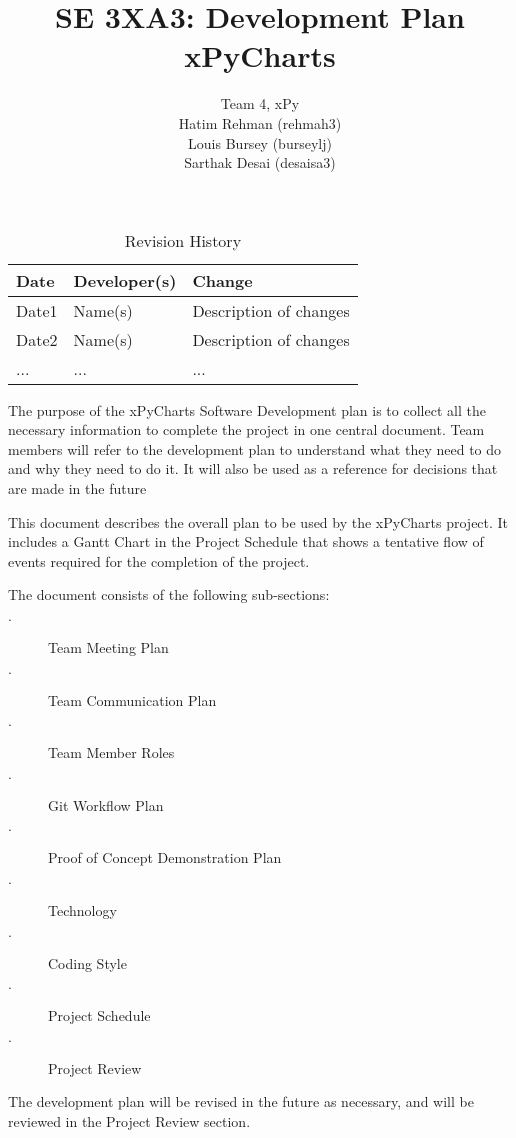 \documentclass{article}
\title{SE 3XA3: Development Plan\\xPyCharts}
\author{Team 4, xPy
		\\ Hatim Rehman (rehmah3)
		\\ Louis Bursey (burseylj)
		\\ Sarthak Desai (desaisa3)
}
\date{}
\begin{document}
\begin{table}[hp]
\caption{Revision History} \label{TblRevisionHistory}
\begin{tabularx}{\textwidth}{llX}
\toprule
\textbf{Date} & \textbf{Developer(s)} & \textbf{Change}\\
\midrule
Date1 & Name(s) & Description of changes\\
Date2 & Name(s) & Description of changes\\
... & ... & ...\\
\bottomrule
\end{tabularx}
\end{table}

\newpage

\maketitle

The purpose of the xPyCharts Software Development plan is to collect all the necessary information to complete the project in one central document. Team members will refer to the development plan to understand what they need to do and why they need to do it. It will also be used as a reference for decisions that are made in the future

This document describes the overall plan to be used by the xPyCharts project. It includes a Gantt Chart in the Project Schedule that shows a tentative flow of events required for the completion of the project.

The document consists of the following sub-sections:
\begin{description}
  \item[$\cdot$] Team Meeting Plan
  \item[$\cdot$] Team Communication Plan
  \item[$\cdot$] Team Member Roles
  \item[$\cdot$] Git Workflow Plan
  \item[$\cdot$] Proof of Concept Demonstration Plan
  \item[$\cdot$] Technology
  \item[$\cdot$] Coding Style
  \item[$\cdot$] Project Schedule
  \item[$\cdot$] Project Review
  
\end{description}

The development plan will be revised in the future as necessary, and will be reviewed in the Project Review section. 
\end{document}
